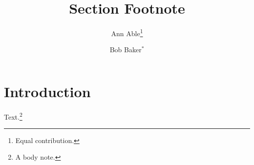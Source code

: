 \documentclass{article}
\title{Section Footnote}
\author{Ann Able\thanks{Equal contribution.} \and Bob Baker$^{*}$}
\begin{document}
\maketitle
\section{Introduction}
Text.\footnote{A body note.}
\end{document}
